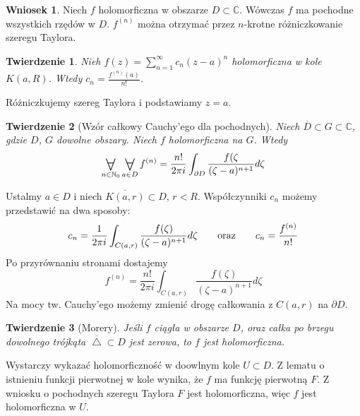 \documentclass[11pt]{article}
\newcommand{\closure}[1]{\overline{#1}} %
\newcommand{\Forall}[1]{\mathop{\vcenter{\hbox{\LARGE$\forall$}}}\limits_{#1}} %
\theoremstyle{plain}
\newtheorem*{theorem}{Twierdzenie}
\theoremstyle{definition}
\newtheorem*{corollary}{Wniosek}
\theoremstyle{remark}
\let\oldendproof\endproof
\renewenvironment{proof}[1][\proofname]{
  \oldproof[\textsc{\small #1}]
}{\oldendproof}
\begin{document}
\begin{corollary}
  Niech $ f $ holomorficzna w obszarze $ D \subset \mathbb{C} $. Wówczas $ f $ ma pochodne wszystkich rzędów w $ D $.
  $ f^{(n)} $ można otrzymać przez $ n $-krotne różniczkowanie szeregu Taylora.
\end{corollary}

\begin{theorem}
  Nieh $ f(z) = \sum_{n=1}^{\infty} c_{n}(z-a)^{n} $ holomorficzna w kole $ K(a, R) $.
  Wtedy $ c_{n} = \frac{f^{(n)}(a)}{n!} $.
\end{theorem}

\begin{proof}
  Różniczkujemy szereg Taylora i podstawiamy $ z = a $.
\end{proof}

\begin{theorem}[Wzór całkowy Cauchy'ego dla pochodnych]
  Niech $ \closure{D} \subset G \subset \mathbb{C} $, gdzie $ D $, $ G $ dowolne obszary.
  Niech $ f $ holomorficzna na $ G $.
  Wtedy
  $$ \Forall{n \in \mathbb{N}_0} \Forall{a \in D} f^{(n)} = \frac{n!}{2 \pi i} \int_{\partial D} \frac{f(\zeta}{(\zeta - a)^{n+1}} d\zeta $$
\end{theorem}

\begin{proof}
  Ustalmy $ a \in D $ i niech $ \closure{K(a, r)} \subset D $, $ r < R $.
  Współczynniki $ c_n $ możemy przedstawić na dwa sposoby:
  $$
    c_n = \frac{1}{2 \pi i} \int_{C(a, r)} \frac{f(\zeta)}{(\zeta-a)^{n+1}} d\zeta
    \qquad \textnormal{oraz} \qquad
    c_n = \frac{f^{(n)}}{n!}
  $$
  Po przyrównaniu stronami dostajemy
  $$
    f^{(n)} = \frac{n!}{2 \pi i} \int_{C(a, r)} \frac{f(\zeta)}{(\zeta-a)^{n+1}} d\zeta
  $$
  Na mocy tw. Cauchy'ego możemy zmienić drogę całkowania z $ C(a, r) $ na $ \partial D $.
\end{proof}

\begin{theorem}[Morery]
  Jeśli $ f $ ciągła w obszarze $ D $, oraz
  całka po brzegu dowolnego trójkąta $ \closure{\bigtriangleup} \subset D $ jest zerowa,
  to $ f $ jest holomorficzna.
\end{theorem}

\begin{proof}
  Wystarczy wykazać holomorficzność w doowlnym kole $ U \subset D $.
  Z lematu o istnieniu funkcji pierwotnej w kole wynika, że $ f $ ma funkcję pierwotną $ F $.
  Z wniosku o pochodnych szeregu Taylora $ F $ jest holomorficzna, więc $ f $ jest holomorficzna w $ U $.
\end{proof}
\end{document}
